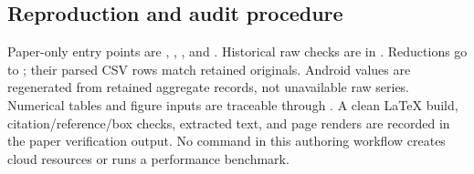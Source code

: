 \subsection{Reproduction and audit procedure}
Paper-only entry points are , , , and . Historical raw checks are in . Reductions go to ; their parsed CSV rows match retained originals. Android values are regenerated from retained aggregate records, not unavailable raw series. Numerical tables and figure inputs are traceable through . A clean LaTeX build, citation/reference/box checks, extracted text, and page renders are recorded in the paper verification output. No command in this authoring workflow creates cloud resources or runs a performance benchmark.
